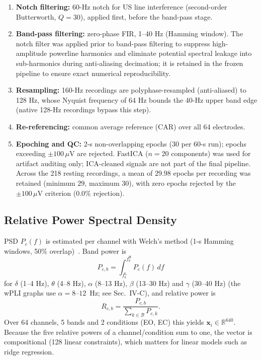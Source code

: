 \documentclass{ieeeaccess}
\begin{document}
\begin{enumerate}[leftmargin=*]
    \item \textbf{Notch filtering:} 60-Hz notch for US line interference (second-order Butterworth, $Q = 30$), applied first, before the band-pass stage.
    \item \textbf{Band-pass filtering:} zero-phase FIR, 1--40 Hz (Hamming window). The notch filter was applied prior to band-pass filtering to suppress high-amplitude powerline harmonics and eliminate potential spectral leakage into sub-harmonics during anti-aliasing decimation; it is retained in the frozen pipeline to ensure exact numerical reproducibility.
    \item \textbf{Resampling:} 160-Hz recordings are polyphase-resampled (anti-aliased) to 128 Hz, whose Nyquist frequency of 64 Hz bounds the 40-Hz upper band edge (native 128-Hz recordings bypass this step).
    \item \textbf{Re-referencing:} common average reference (CAR) over all 64 electrodes.
    \item \textbf{Epoching and QC:} 2-s non-overlapping epochs (30 per 60-s run); epochs exceeding $\pm100\,\mu\text{V}$ are rejected. FastICA ($n=20$ components) was used for artifact auditing only; ICA-cleaned signals are not part of the final pipeline. Across the 218 resting recordings, a mean of $29.98$ epochs per recording was retained (minimum $29$, maximum 30), with zero epochs rejected by the $\pm100\,\mu\text{V}$ criterion ($0.0\%$ rejection).
\end{enumerate}

\subsection{Relative Power Spectral Density}

PSD $P_c(f)$ is estimated per channel with Welch's method (1-s Hamming windows, 50\% overlap)~\cite{welch1967}. Band power is
\begin{equation}
P_{c,b} = \int_{f_b^{\mathrm{L}}}^{f_b^{\mathrm{H}}} P_c(f)\, df
\end{equation}
for $\delta$ (1--4 Hz), $\theta$ (4--8 Hz), $\alpha$ (8--13 Hz), $\beta$ (13--30 Hz) and $\gamma$ (30--40 Hz) (the wPLI graphs use $\alpha=8$--$12$~Hz; see Sec.~IV-C), and relative power is
\begin{equation}
R_{c,b} = \frac{P_{c,b}}{\sum_{k \in \mathcal{B}} P_{c,k}} .
\end{equation}
Over 64 channels, 5 bands and 2 conditions (EO, EC) this yields $\mathbf{x}_i\in\mathbb{R}^{640}$. Because the five relative powers of a channel/condition sum to one, the vector is compositional (128 linear constraints), which matters for linear models such as ridge regression.
\end{document}
